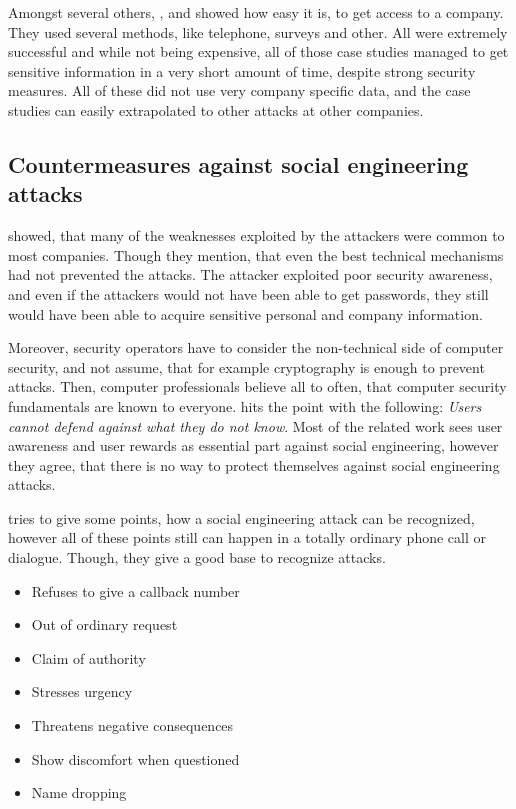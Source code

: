 Amongst several others, \cite{mitnick2003}, \cite{orgill2004} and
\cite{winkler1995} showed how easy it is, to get access to a company. They used
several methods, like telephone, surveys and other. All were extremely
successful and while not being expensive, all of those case studies managed to
get sensitive information in a very short amount of time, despite strong
security measures. All of these did not use very company specific data, and the
case studies can easily extrapolated to other attacks at other companies.

\subsection{Countermeasures against social engineering attacks}

\cite{winkler1995} showed, that many of the weaknesses exploited by the
attackers were common to most companies. Though they mention, that even the
best technical mechanisms had not prevented the attacks. The attacker exploited
poor security awareness, and even if the attackers would not have been able to
get passwords, they still would have been able to acquire sensitive personal
and company information.

Moreover, security operators have to consider the non-technical side of
computer security, and not assume, that for example cryptography is enough to
prevent attacks. Then, computer professionals believe all to often, that
computer security fundamentals are known to everyone. \cite{lively2003} hits
the point with the following: \textit{\glqq{}Users cannot defend against what
they do not know\grqq{}}. Most of the related work sees user awareness and user
rewards as essential part against social engineering, however they agree, that
there is no way to protect themselves against social engineering attacks.

\cite{mitnick2003} tries to give some points, how a social engineering attack
can be recognized, however all of these points still can happen in a totally
ordinary phone call or dialogue. Though, they give a good base to recognize
attacks.

\begin{itemize}
  \item Refuses to give a callback number
  \item Out of ordinary request
  \item Claim of authority
  \item Stresses urgency
  \item Threatens negative consequences
  \item Show discomfort when questioned
  \item Name dropping
\end{itemize}

